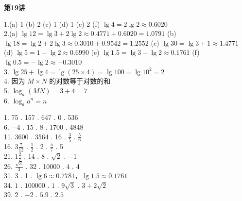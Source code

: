 \textbf{第19讲}

1.(a) 1 \quad (b) 2 \quad (c) 1 \quad (d) 1 \quad (e) 2 \quad (f) $\lg4=2\lg2\approx0.6020$\\
2.(a) $\lg12=\lg3+2\lg2\approx0.4771+0.6020=1.0791$ \quad (b) $\lg18=\lg2+2\lg3\approx0.3010+0.9542=1.2552$ \quad (c) $\lg30=\lg3+1\approx1.4771$ \quad (d) $\lg5=1-\lg2\approx0.6990$ \quad (e) $\lg1.5=\lg3-\lg2\approx0.1761$ \quad (f) $\lg0.5=-\lg2\approx-0.3010$\\
3. $\lg25+\lg4=\lg(25\times4)=\lg100=\lg10^2=2$\\
4. 因为 $M\times N$ 的对数等于对数的和\\
5. $\log_a(MN)=3+4=7$\\
6. $\log_a a^n = n$


1. 75 . 157 . 647 . 0 . 536\\
6. $-4$ . 15 . 8 . 1700 . 4848\\
11. 3600 . 3564 . 16 . $\frac35$ . $\frac56$\\
16. $3\frac{7}{12}$ . $\frac12$ . 2 . $\frac57$ . 5\\
21. $1\frac{2}{7}$ . 14 . 8 . $\sqrt2$ . $-1$\\
26. $\frac{\sqrt3}{3}$ . 32 . 10000 . 4 . 4\\
31. 3 . 1 . $\lg6\approx0.7781$，$\lg1.5\approx0.1761$\\
34. $1$ . $100000$ . $1$ . $9\sqrt3$ . $3+2\sqrt2$\\
39. $2$ . $-2$ . $5.9$ . $2.5$
